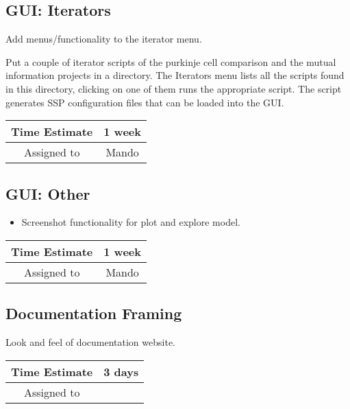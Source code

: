 \documentclass[12pt]{article}
\begin{document}
\subsection{GUI: Iterators}
Add menus/functionality to the iterator menu.

Put a couple of iterator scripts of the purkinje cell comparison and
the mutual information projects in a directory.  The Iterators menu
lists all the scripts found in this directory, clicking on one of them
runs the appropriate script.  The script generates SSP configuration
files that can be loaded into the GUI.

\begin{center}
  \vspace{5mm}
  \centering
  \begin{tabular}{|c|c|}
    \hline
    Time Estimate
    & 1 week \\
    \hline
    Assigned to
    & Mando \\
    \hline
  \end{tabular}
\end{center}


\subsection{GUI: Other}
\begin{itemize}
\item Screenshot functionality for plot and explore model.
\end{itemize}

\begin{center}
  \vspace{5mm}
  \centering
  \begin{tabular}{|c|c|}
    \hline
    Time Estimate
    & 1 week \\
    \hline
    Assigned to
    & Mando \\
    \hline
  \end{tabular}
\end{center}


\subsection{Documentation Framing}

Look and feel of documentation website.

\begin{center}
  \vspace{5mm}
  \centering
  \begin{tabular}{|c|c|}
    \hline
    Time Estimate
    & 3 days \\
    \hline
    Assigned to
    & \\
    \hline
  \end{tabular}
\end{center}
\end{document}
